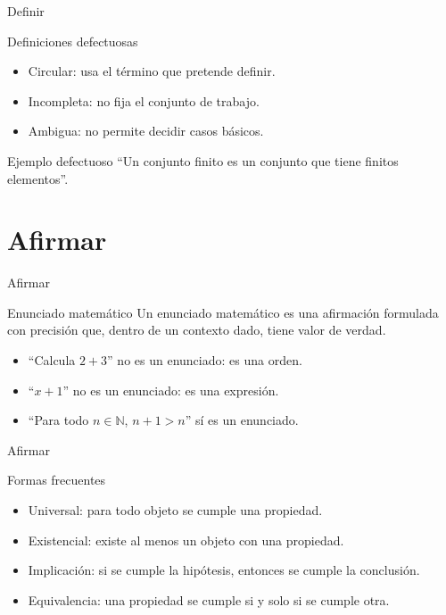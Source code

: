 \documentclass[aspectratio=169,11pt]{beamer}
\newcommand{\N}{\mathbb{N}}
\begin{document}
\begin{frame}{Definir}
\begin{block}{Definiciones defectuosas}
\begin{itemize}
  \item Circular: usa el término que pretende definir.
  \item Incompleta: no fija el conjunto de trabajo.
  \item Ambigua: no permite decidir casos básicos.
\end{itemize}
\end{block}

\begin{exampleblock}{Ejemplo defectuoso}
``Un conjunto finito es un conjunto que tiene finitos elementos''.
\end{exampleblock}
\end{frame}

\section{Afirmar}

\begin{frame}{Afirmar}
\begin{block}{Enunciado matemático}
Un enunciado matemático es una afirmación formulada con precisión que, dentro de
un contexto dado, tiene valor de verdad.
\end{block}

\begin{itemize}
  \item ``Calcula \(2+3\)'' no es un enunciado: es una orden.
  \item ``\(x+1\)'' no es un enunciado: es una expresión.
  \item ``Para todo \(n\in\N\), \(n+1>n\)'' sí es un enunciado.
\end{itemize}
\end{frame}

\begin{frame}{Afirmar}
\begin{block}{Formas frecuentes}
\begin{itemize}
  \item Universal: para todo objeto se cumple una propiedad.
  \item Existencial: existe al menos un objeto con una propiedad.
  \item Implicación: si se cumple la hipótesis, entonces se cumple la conclusión.
  \item Equivalencia: una propiedad se cumple si y solo si se cumple otra.
\end{itemize}
\end{block}
\end{frame}
\end{document}
